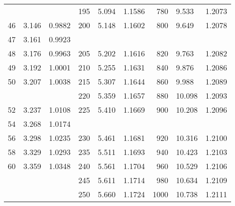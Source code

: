 \documentclass[draft]{article}
\begin{document}
\begin{table}
\begin{center}
\begin{tabular}{rllrllrll}
   &       &        & 195 & 5.094 & 1.1586 & 780 & 9.533 & 1.2073 \\
46 & 3.146 & 0.9882 & 200 & 5.148 & 1.1602 & 800 & 9.649 & 1.2078 \\
47 & 3.161 & 0.9923 \\
48 & 3.176 & 0.9963 & 205 & 5.202 & 1.1616 & 820 & 9.763 & 1.2082 \\
49 & 3.192 & 1.0001 & 210 & 5.255 & 1.1631 & 840 & 9.876 & 1.2086 \\
50 & 3.207 & 1.0038 & 215 & 5.307 & 1.1644 & 860 & 9.988 & 1.2089 \\
   &       &        & 220 & 5.359 & 1.1657 & 880 & 10.098 & 1.2093 \\
52 & 3.237 & 1.0108 & 225 & 5.410 & 1.1669 & 900 & 10.208 & 1.2096 \\
54 & 3.268 & 1.0174 \\
56 & 3.298 & 1.0235 & 230 & 5.461 & 1.1681 & 920 & 10.316 & 1.2100 \\
58 & 3.329 & 1.0293 & 235 & 5.511 & 1.1693 & 940 & 10.423 & 1.2103 \\
60 & 3.359 & 1.0348 & 240 & 5.561 & 1.1704 & 960 & 10.529 & 1.2106 \\
   &       &        & 245 & 5.611 & 1.1714 & 980 & 10.634 & 1.2109 \\
   &       &        & 250 & 5.660 & 1.1724 & 1000 & 10.738 & 1.2111 \\
\hline
\end{tabular}
\end{center}
\normalsize
\end{table}
\clearpage
\end{document}
